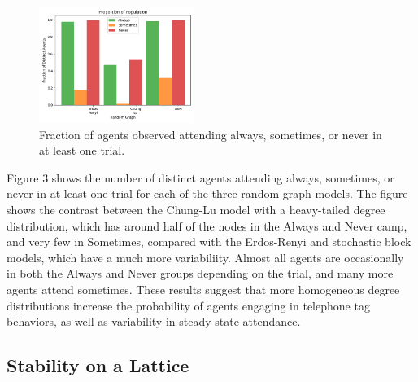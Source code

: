 \documentclass[12pt]{article}
\begin{document}
\begin{figure}[h!]
\includegraphics[width=0.45\textwidth]{always_sometimes_never.png}
\caption{Fraction of agents observed attending always, sometimes, or never in at least one trial.}
\end{figure}

Figure 3 shows the number of distinct agents attending always, sometimes, or never in at least one trial for each of the three random graph models.  The figure shows the contrast between the Chung-Lu model with a heavy-tailed degree distribution, which has around half of the nodes in the Always and Never camp, and very few in Sometimes, compared with the Erdos-Renyi and stochastic block models, which have a much more variabiliity.  Almost all agents are occasionally in both the Always and Never groups depending on the trial, and many more agents attend sometimes.  These results suggest that more homogeneous degree distributions increase the probability of agents engaging in telephone tag behaviors, as well as variability in steady state attendance.

\subsection{Stability on a Lattice}
\end{document}
